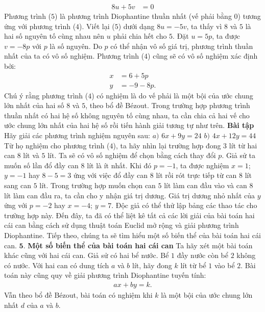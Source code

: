 \begin{multicols}{2}
\begin{align*}
		8u+5v&=0		\tag{$5$}
	\end{align*}
	Phương trình ($5$) là phương trình Diophantine thuần nhất (vế phải bằng $0$) tương ứng với phương trình ($4$). Viết lại ($5$) dưới dạng $8u=-5v$, ta thấy vì $8$ và $5$ là hai số nguyên tố cùng nhau nên $u$ phải chia hết cho $5$. Đặt $u=5p$, ta được $v=-8p$ với $p$ là số nguyên. Do $p$ có thể nhận vô số giá trị, phương trình thuần nhất của ta có vô số nghiệm. 
	\vskip 0.1cm
	Phương trình ($4$) cũng sẽ có vô số nghiệm xác định bởi: 
	\begin{align*}
		x&=6+5p\\
		y&=-9-8p.
	\end{align*}
	Chú ý rằng phương trình ($4$) có nghiệm là do vế phải là một bội của ước chung lớn nhất của hai số $8$ và $5$, theo bổ đề Bézout. Trong trường hợp phương trình thuần nhất có hai hệ số không nguyên tố cùng nhau, ta cần chia cả hai vế cho ước chung lớn nhất của hai hệ số rồi tiến hành giải tương tự như trên.
	\vskip 0.1cm
	\textbf{\color{hoccungpi}Bài tập}
	\vskip 0.1cm
	Hãy giải các phương trình nghiệm nguyên sau:
	\vskip 0.1cm
	$a)$ $6x+9y=24$
	\vskip 0.1cm
	$b)$ $4x+12y=44$
	\vskip 0.1cm
	Từ họ nghiệm cho phương trình ($4$), ta hãy nhìn lại trường hợp đong $3$ lít từ hai can $8$ lít và $5$ lít. Ta sẽ có vô số nghiệm để chọn bằng cách thay đổi $p$. Giả sử ta muốn số lần đổ đầy can $8$ lít là ít nhất. Khi đó $p=-1$, ta được nghiệm $x=1$; $y=-1$ hay $8-5=3$ ứng với việc đổ đầy can $8$ lít rồi rót trực tiếp từ can $8$ lít sang can $5$ lít. Trong trường hợp muốn chọn can $5$ lít làm can đầu vào và can $8$ lít làm can đầu ra, ta cần cho y nhận giá trị dương. Giá trị dương nhỏ nhất của $y$ ứng với $p=-2$ hay $x=-4$; $y=7$. Độc giả có thể thử lập bảng các thao tác cho trường hợp này.
	\vskip 0.1cm
	Đến đây, ta đã có thể liệt kê tất cả các lời giải của bài toán hai cái can bằng cách sử dụng thuật toán Euclid mở rộng và giải phương trình Diophantine. Tiếp theo, chúng ta sẽ tìm hiểu một số biến thể của bài toán hai cái can.
	\vskip 0.1cm
	$\pmb{5.}$ \textbf{\color{hoccungpi}Một số biến thể của bài toán hai cái can}
	\vskip 0.1cm 
	Ta hãy xét một bài toán khác cũng với hai cái can. 
	\vskip 0.1cm
	Giả sử có hai bể nước. Bể $1$ đầy nước còn bể $2$ không có nước. Với hai can có dung tích $a$ và $b$ lít, hãy đong $k$ lít từ bể $1$ vào bể $2$.
	\vskip 0.1cm
	Bài toán này cũng quy về giải phương trình Diophantine tuyến tính:
	\begin{align*}
		ax+by=k.
	\end{align*}
	Vẫn theo bổ đề Bézout, bài toán có nghiệm khi $k$ là một bội của ước chung lớn nhất $d$ của $a$ và $b$.

\end{multicols}

